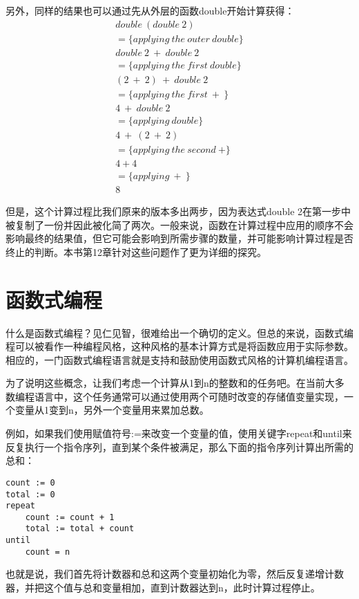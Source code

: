 另外，同样的结果也可以通过先从外层的函数double开始计算获得：
\[ \begin{split}
double~(double~2)\\
=\{applying~the~outer~double\}\\
double~2~+~double~2\\
=\{applying~the~first~double\}\\
(2~+~2)~+~double~2\\
=\{applying~the~first~+~\}\\
4~+~double~2\\
= \{applying~double\}\\
4~+~(2~+~2)\\
= \{applying~the~second~+\}\\
4+4\\
= \{applying~+~\}\\
8
\end{split} \]

但是，这个计算过程比我们原来的版本多出两步，因为表达式double 2在第一步中被复制了一份并因此被化简了两次。一般来说，函数在计算过程中应用的顺序不会影响最终的结果值，但它可能会影响到所需步骤的数量，并可能影响计算过程是否终止的判断。本书第12章针对这些问题作了更为详细的探究。

\section{函数式编程}

什么是函数式编程？见仁见智，很难给出一个确切的定义。但总的来说，函数式编程可以被看作一种编程风格，这种风格的基本计算方式是将函数应用于实际参数。相应的，一门函数式编程语言就是支持和鼓励使用函数式风格的计算机编程语言。

为了说明这些概念，让我们考虑一个计算从1到n的整数和的任务吧。在当前大多数编程语言中，这个任务通常可以通过使用两个可随时改变的存储值变量实现，一个变量从1变到n，另外一个变量用来累加总数。

例如，如果我们使用赋值符号:=来改变一个变量的值，使用关键字repeat和until来反复执行一个指令序列，直到某个条件被满足，那么下面的指令序列计算出所需的总和：

\begin{verbatim}
count := 0
total := 0
repeat
    count := count + 1
    total := total + count
until
    count = n
\end{verbatim}

也就是说，我们首先将计数器和总和这两个变量初始化为零，然后反复递增计数器，并把这个值与总和变量相加，直到计数器达到n，此时计算过程停止。

